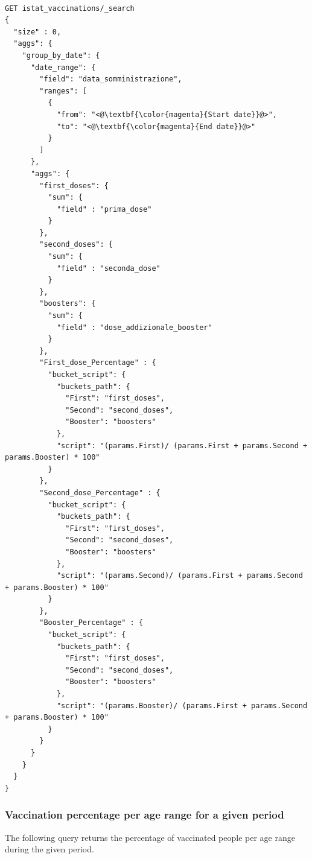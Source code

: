 \documentclass{article}
\begin{document}
\begin{lstlisting}[language=cypher, label=lst:cypher-example]

GET istat_vaccinations/_search
{
  "size" : 0,
  "aggs": {
    "group_by_date": {
      "date_range": {
        "field": "data_somministrazione",
        "ranges": [
          {
            "from": "<@\textbf{\color{magenta}{Start date}}@>",
            "to": "<@\textbf{\color{magenta}{End date}}@>"
          }
        ]
      },
      "aggs": {
        "first_doses": {
          "sum": {
            "field" : "prima_dose"
          }
        },
        "second_doses": {
          "sum": {
            "field" : "seconda_dose"
          }
        },
        "boosters": {
          "sum": {
            "field" : "dose_addizionale_booster"
          }
        },
        "First_dose_Percentage" : {
          "bucket_script": {
            "buckets_path": {
              "First": "first_doses",
              "Second": "second_doses",
              "Booster": "boosters"
            },
            "script": "(params.First)/ (params.First + params.Second + params.Booster) * 100"
          }
        },
        "Second_dose_Percentage" : {
          "bucket_script": {
            "buckets_path": {
              "First": "first_doses",
              "Second": "second_doses",
              "Booster": "boosters"
            },
            "script": "(params.Second)/ (params.First + params.Second + params.Booster) * 100"
          }
        },
        "Booster_Percentage" : {
          "bucket_script": {
            "buckets_path": {
              "First": "first_doses",
              "Second": "second_doses",
              "Booster": "boosters"
            },
            "script": "(params.Booster)/ (params.First + params.Second + params.Booster) * 100"
          }
        }
      }
    }
  }
}

\end{lstlisting}
\newpage
\subsubsection{Vaccination percentage per age range for a given period}
The following query returns the percentage of vaccinated people per age range during the given period.
\end{document}
